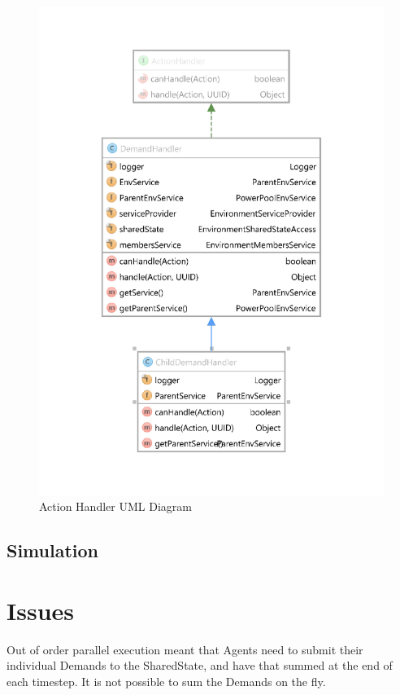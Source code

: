 \begin{figure}[!h]
	\centering
	\includegraphics[scale=0.4]{Images/ActionHandlerUML.png}
	\caption{Action Handler UML Diagram}
	\label{fig:ActionHandlerUML}
\end{figure}

\subsection*{Simulation}


\section*{Issues}
Out of order parallel execution meant that Agents need to submit their individual Demands to the SharedState, and have that summed at the end of each timestep. It is not possible to sum the Demands on the fly.

